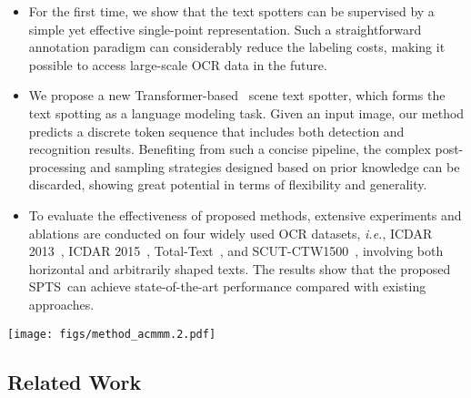 \documentclass[sigconf]{acmart}
\newcommand{\methodName}{SPTS}
\begin{document}
\begin{itemize}
\item For the first time, we show that the text spotters can be supervised by a simple yet effective single-point representation. Such a straightforward annotation paradigm can considerably reduce the labeling costs, making it possible to access large-scale OCR data in the future.
    \item We propose a new Transformer-based~\cite{vaswani2017attention} scene text spotter, which forms the text spotting as a language modeling task. Given an input image, our method predicts a discrete token sequence that includes both detection and recognition results. Benefiting from such a concise pipeline, the complex post-processing and sampling strategies designed based on prior knowledge can be discarded, showing great potential in terms of flexibility and generality.
    \item To evaluate the effectiveness of proposed methods, extensive experiments and ablations are conducted on four widely used OCR datasets, \emph{i.e.}, ICDAR 2013~\cite{karatzas2013icdar}, ICDAR 2015~\cite{karatzas2015icdar}, Total-Text~\cite{ch2017total}, and SCUT-CTW1500~\cite{liu2019curved}, involving both horizontal and arbitrarily shaped texts. The results show that the proposed \methodName\ can achieve state-of-the-art performance compared with existing approaches.
\end{itemize}


\begin{figure*}[t!]
	\centering
\texttt{[image: figs/method\_acmmm.2.pdf]}
	\caption{Overall framework of the proposed \methodName. The visual and contextual features are first extracted by a series of CNN and Transformer encoders. Then, the features are auto-regressively decoded into a sequence that contains both localization and recognition information, which is subsequently translated into point coordinates and text transcriptions. Only a point-level annotation is required for training.}
	\label{fig:method}
\end{figure*}

\subsection{Related Work}
\end{document}
